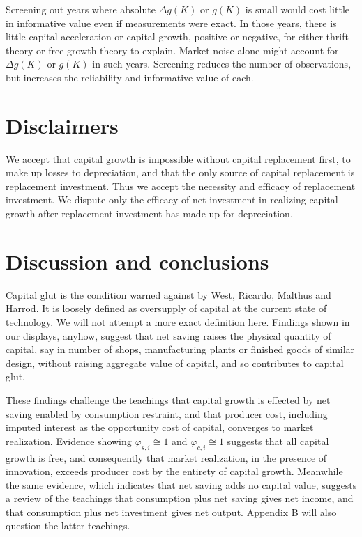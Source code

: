 \documentclass[a4paper,fleqn]{latex_styles/cas-sc}
\begin{document}
Screening out years where absolute \(\Delta g(K)\) or $g(K)$ is small would cost
little in informative value even if measurements were exact. In those
years, there is little capital acceleration or capital growth, positive or negative, for
either thrift theory or free growth theory to explain. Market noise
alone might account for \(\Delta g(K)\) or $g(K)$ in such years. Screening reduces
the number of observations, but increases the reliability and
informative value of each.

\hypertarget{disclaimers}{%
\section{Disclaimers}\label{disclaimers}}

We accept that capital growth is impossible without capital replacement first, to make up losses to depreciation, and that the only source of capital replacement is replacement investment. Thus we accept the necessity and efficacy of replacement investment. We dispute only the efficacy of net investment in realizing capital growth after replacement investment has made up for depreciation.

\hypertarget{discussion-and-conclusions}{%
\section{Discussion and conclusions}\label{discussion-and-conclusions}}

Capital glut is the condition warned against by West, Ricardo, Malthus
and Harrod. It is loosely defined as oversupply of capital at the
current state of technology. We will not attempt a more exact definition
here. Findings shown in our displays, anyhow, suggest that net
saving raises the physical quantity of capital, say in number of
shops, manufacturing plants or finished goods of similar design, without
raising aggregate value of capital, and so contributes to capital glut.

These findings challenge the teachings that capital growth is effected
by net saving enabled by consumption restraint, and that producer
cost, including imputed interest as the opportunity cost of capital,
converges to market realization. Evidence showing \(\overline{\varphi_{s,i}} \cong 1\)
and \(\overline{\varphi_{c,i}} \cong 1\) suggests that all capital growth is free, and
consequently that market realization, in the presence of innovation,
exceeds producer cost by the entirety of capital growth. Meanwhile the same evidence, which indicates that net saving adds no capital value, suggests a review of the teachings that consumption plus net saving gives net income, and that consumption plus net investment gives net output. Appendix B will also question the latter teachings.
\end{document}
